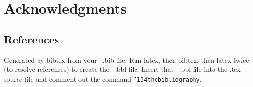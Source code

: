 \documentclass{vldb}
\begin{document}
\section{Acknowledgments}




\subsection{References}
Generated by bibtex from your ~.bib file.  Run latex,
then bibtex, then latex twice (to resolve references)
to create the ~.bbl file.  Insert that ~.bbl file into
the .tex source file and comment out
the command \texttt{{\char'134}thebibliography}.




\begin{appendix}

\end{appendix}
\end{document}
